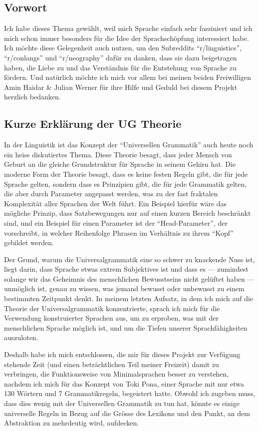 \documentclass{article}
\begin{document}
\subsection{Vorwort}
Ich habe dieses Thema gewählt, weil mich Sprache einfach sehr fasziniert und ich mich schon immer besonders
für die Idee der Sprachschöpfung interessiert habe. Ich möchte diese Gelegenheit auch nutzen,
um den Subreddits ``r/linguistics'', ``r/conlangs'' und ``r/neography'' dafür zu danken, dass sie dazu beigetragen haben,
die Liebe zu und das Verständnis für die Entstehung von Sprache zu fördern.
Und natürlich möchte ich mich vor allem bei meinen beiden Freiwilligen Amin Haidar \& Julian Werner
für ihre Hilfe und Geduld bei diesem Projekt herzlich bedanken.

\subsection{Kurze Erklärung der UG Theorie}
In der Linguistik ist das Konzept der ``Universellen Grammatik'' auch heute noch ein heiss diskutiertes Thema.
Diese Theorie besagt, dass jeder Mensch von Geburt an die gleiche Grundstruktur für Sprache in seinem Gehirn hat.
Die moderne Form der Theorie besagt, dass es keine festen Regeln gibt, die für jede Sprache gelten,
sondern dass es Prinzipien gibt, die für jede Grammatik gelten, die aber durch Parameter angepasst werden,
was zu der fast fraktalen Komplexität aller Sprachen der Welt führt. Ein Beispiel hierfür wäre das mögliche Prinzip,
dass Satzbewegungen nur auf einen kurzen Bereich beschränkt sind, und ein Beispiel für einen Parameter ist der ``Head-Parameter'',
der vorschreibt, in welcher Reihenfolge Phrasen im Verhältnis zu ihrem ``Kopf'' gebildet werden.\citep{ChUGAI}

Der Grund, warum die Universalgrammatik eine so schwer zu knackende Nuss ist, liegt darin, dass Sprache etwas extrem Subjektives
ist und dass es --- zumindest solange wir das Geheimnis des menschlichen Bewusstseins nicht gelüftet haben --- unmöglich ist,
genau zu wissen, was jemand bewusst oder unbewusst zu einem bestimmten Zeitpunkt denkt. In meinem letzten Aufsatz,
in dem ich mich auf die Theorie der Universalgrammatik konzentrierte, sprach ich mich für die Verwendung konstruierter Sprachen aus,
um zu erproben, was mit der menschlichen Sprache möglich ist, und um die Tiefen unserer Sprachfähigkeiten auszuloten.

Deshalb habe ich mich entschlossen, die mir für dieses Projekt zur Verfügung stehende Zeit (und einen beträchtlichen
Teil meiner Freizeit) damit zu verbringen, die Funktionsweise von Minimalsprachen besser zu verstehen,
nachdem ich mich für das Konzept von Toki Pona, einer Sprache mit nur etwa 130 Wörtern und 7 Grammatikregeln\citep{Lang14},
begeistert hatte. Obwohl ich zugeben muss, dass dies wenig mit der Universellen Grammatik zu tun hat,
könnte es einige universelle Regeln in Bezug auf die Grösse des Lexikons und den Punkt,
an dem Abstraktion zu mehrdeutig wird, aufdecken.
\end{document}
